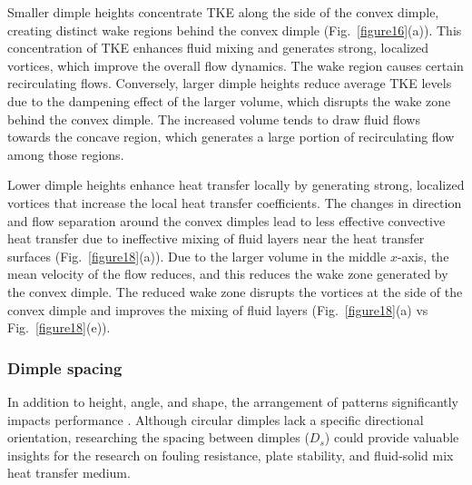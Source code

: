 \documentclass[review,12pt]{elsarticle}
\begin{document}
Smaller dimple heights concentrate TKE along the side of the convex dimple, creating distinct wake regions behind the convex dimple (Fig.~\ref{figure16}(a)). This concentration of TKE enhances fluid mixing and generates strong, localized vortices, which improve the overall flow dynamics. The wake region causes certain recirculating flows. Conversely, larger dimple heights reduce average TKE levels due to the dampening effect of the larger volume, which disrupts the wake zone behind the convex dimple. The increased volume tends to draw fluid flows towards the concave region, which generates a large portion of recirculating flow among those regions.

Lower dimple heights enhance heat transfer locally by generating strong, localized vortices that increase the local heat transfer coefficients. The changes in direction and flow separation around the convex dimples lead to less effective convective heat transfer due to ineffective mixing of fluid layers near the heat transfer surfaces (Fig.~\ref{figure18}(a)). Due to the larger volume in the middle $x$-axis, the mean velocity of the flow reduces, and this reduces the wake zone generated by the convex dimple. The reduced wake zone disrupts the vortices at the side of the convex dimple and improves the mixing of fluid layers (Fig.~\ref{figure18}(a) vs Fig.~\ref{figure18}(e)).

\subsubsection{Dimple spacing}
\label{sec:dimple_spacing_results}

In addition to height, angle, and shape, the arrangement of patterns significantly impacts performance \citep{jiang2019a, hamedi2024}. Although circular dimples lack a specific directional orientation, researching the spacing between dimples ($D_s$) could provide valuable insights for the research on fouling resistance, plate stability, and fluid-solid mix heat transfer medium.
\end{document}
